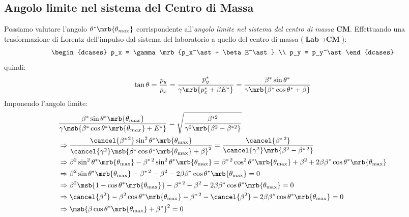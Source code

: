 
\subsection{Angolo limite nel sistema del Centro di Massa}
Possiamo valutare l'angolo $\theta^\ast\mrb{\theta_{max}}$ corrispondente
all'\textit{angolo limite nel sistema del centro di massa} \textbf{CM}.
Effettuando una trasformazione di Lorentz dell'impulso dal sistema del
laboratorio a quello del centro di massa ($\textbf{Lab} \to \textbf{CM}$):
\begin{equation}
	\begin{dcases}
		p_x = \gamma \mrb{p_x^\ast + \beta E^\ast}
		\\
		p_y = p_y^\ast
	\end{dcases}
\end{equation}
quindi:
\begin{equation}
	\tan \theta = \frac{p_y}{p_x} = \frac{p_y^\ast}{\gamma \mrb{p_x^\ast + \beta E^\ast}}
	= \frac{\beta^\ast \sin \theta^\ast}{\gamma \mrb{\beta^\ast \cos \theta^\ast + \beta}}
\end{equation}
Imponendo l'angolo limite:
\begin{align}
	 & \frac{\beta^\ast \sin \theta^\ast\mrb{\theta_{max}}}{\gamma \msb{\beta^\ast \cos
			\theta^\ast\mrb{\theta_{max}} + E^\ast}} = \sqrt{\frac{\beta^{\ast2}}{\gamma^2
			\mrb{\beta^2 - \beta^{\ast2}}}}
	\\\notag
	 & \Rightarrow \frac{\cancel{\beta ^{\ast\,2}} \sin ^{2} \theta^\ast
		\mrb{\theta _\text{max}}}{\cancel{\gamma^2} \msb{\beta^\ast \cos
			\theta^\ast \mrb{\theta_\text{max}} + \beta}^{2}} = \frac{\cancel{\beta
			^{\ast\,2}}}{\cancel{\gamma^2} \mrb{\beta^2 - \beta ^{\ast\,2}}}
	\\\notag
	 & \Rightarrow \beta^2 \sin ^{2} \theta^\ast \mrb{\theta _\text{max}} - \beta
	^{\ast\,2} \sin ^{2} \theta^\ast \mrb{\theta _\text{max}} = \beta
	^{\ast\,2} \cos ^{2} \theta^\ast \mrb{\theta _\text{max}} + \beta^2 + 2
	\beta \beta^\ast \cos \theta^\ast \mrb{\theta _\text{max}}
	\\\notag
	 & \Rightarrow \beta^2 \sin \theta^\ast \mrb{\theta _\text{max}} - \beta
	^{\ast\,2} - \beta^2 - 2 \beta \beta^\ast \cos \theta^\ast \mrb{\theta
		_\text{max}} = 0
	\\\notag
	 & \Rightarrow \beta^2 \msb{1 -\cos \theta^\ast \mrb{\theta _\text{max}}} -
	\beta ^{\ast\,2} - \beta^2 - 2 \beta \beta^\ast \cos \theta^\ast
	\mrb{\theta _\text{max}} = 0
	\\\notag
	 & \Rightarrow \cancel{\beta^2} - \beta^2 \cos \theta^\ast \mrb{\theta
		_\text{max}} - \beta ^{\ast\,2} - \cancel{\beta^2} - 2 \beta \beta^\ast
	\cos \theta^\ast \mrb{\theta _\text{max}} = 0
	\\\notag
	 & \Rightarrow \msb{\beta \cos \theta^\ast \mrb{\theta_\text{max}} +
		\beta^\ast}^{2} = 0
\end{align}
